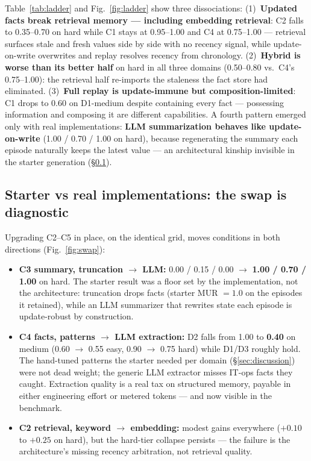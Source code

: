 \documentclass[journal]{IEEEtran}
\begin{document}
Table~\ref{tab:ladder} and Fig.~\ref{fig:ladder} show three dissociations:
(1)~\textbf{Updated facts break retrieval memory --- including embedding
retrieval}: C2 falls to 0.35--0.70 on hard while C1 stays at 0.95--1.00 and
C4 at 0.75--1.00 --- retrieval surfaces stale and fresh values side by side
with no recency signal, while update-on-write overwrites and replay resolves
recency from chronology. (2)~\textbf{Hybrid is worse than its better half}
on hard in all three domains (0.50--0.80 vs.\ C4's 0.75--1.00): the
retrieval half re-imports the staleness the fact store had eliminated.
(3)~\textbf{Full replay is update-immune but composition-limited}: C1 drops
to 0.60 on D1-medium despite containing every fact --- possessing information
and composing it are different capabilities. A fourth pattern emerged only
with real implementations: \textbf{LLM summarization behaves like
update-on-write} (1.00 / 0.70 / 1.00 on hard), because regenerating the
summary each episode naturally keeps the latest value --- an architectural
kinship invisible in the starter generation (\S\ref{sec:swap}).

\subsection{Starter vs real implementations: the swap is diagnostic}
\label{sec:swap}

Upgrading C2--C5 in place, on the identical grid, moves conditions in both
directions (Fig.~\ref{fig:swap}):

\begin{itemize}
\item \textbf{C3 summary, truncation $\to$ LLM:} 0.00 / 0.15 / 0.00 $\to$
\textbf{1.00 / 0.70 / 1.00} on hard. The starter result was a floor set by
the implementation, not the architecture: truncation drops facts (starter
MUR $= 1.0$ on the episodes it retained), while an LLM summarizer that
rewrites state each episode is update-robust by construction.
\item \textbf{C4 facts, patterns $\to$ LLM extraction:} D2 falls from 1.00
to \textbf{0.40} on medium (0.60 $\to$ 0.55 easy, 0.90 $\to$ 0.75 hard)
while D1/D3 roughly hold. The hand-tuned patterns the starter needed per
domain (\S\ref{sec:discussion}) were not dead weight; the generic LLM
extractor misses IT-ops facts they caught. Extraction quality is a real tax
on structured memory, payable in either engineering effort or metered tokens
--- and now visible in the benchmark.
\item \textbf{C2 retrieval, keyword $\to$ embedding:} modest gains
everywhere ($+0.10$ to $+0.25$ on hard), but the hard-tier collapse persists
--- the failure is the architecture's missing recency arbitration, not
retrieval quality.
\end{itemize}
\end{document}
